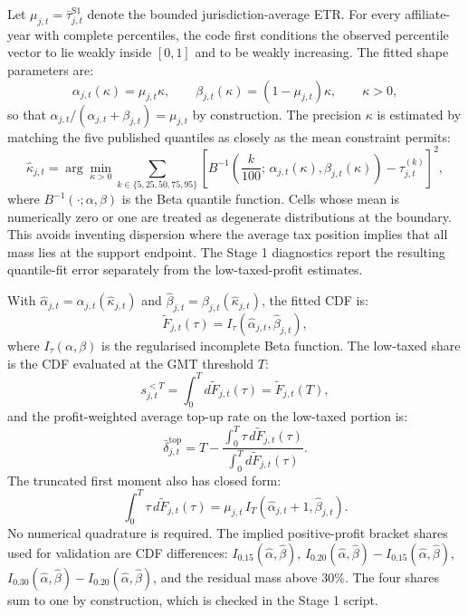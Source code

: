 \documentclass[11pt,a4paper]{article}
\begin{document}
Let $\mu_{j,t} = \bar{\tau}_{j,t}^{\text{S1}}$ denote the bounded jurisdiction-average ETR. For every affiliate-year with complete percentiles, the code first conditions the observed percentile vector to lie weakly inside $[0,1]$ and to be weakly increasing. The fitted shape parameters are:
\begin{equation}\label{eq:beta_shape}
\alpha_{j,t}(\kappa) = \mu_{j,t}\kappa, \qquad
\beta_{j,t}(\kappa) = (1-\mu_{j,t})\kappa, \qquad \kappa>0,
\end{equation}
so that $\alpha_{j,t}/(\alpha_{j,t}+\beta_{j,t}) = \mu_{j,t}$ by construction. The precision $\kappa$ is estimated by matching the five published quantiles as closely as the mean constraint permits:
\begin{equation}\label{eq:beta_fit}
\hat{\kappa}_{j,t}
= \arg\min_{\kappa>0}
\sum_{k \in \{5,25,50,75,95\}}
\left[
B^{-1}\!\left(\frac{k}{100};\,\alpha_{j,t}(\kappa),\beta_{j,t}(\kappa)\right)
- \tau_{j,t}^{(k)}
\right]^2 ,
\end{equation}
where $B^{-1}(\cdot;\alpha,\beta)$ is the Beta quantile function. Cells whose mean is numerically zero or one are treated as degenerate distributions at the boundary. This avoids inventing dispersion where the average tax position implies that all mass lies at the support endpoint. The Stage 1 diagnostics report the resulting quantile-fit error separately from the low-taxed-profit estimates.

With $\hat{\alpha}_{j,t}=\alpha_{j,t}(\hat{\kappa}_{j,t})$ and $\hat{\beta}_{j,t}=\beta_{j,t}(\hat{\kappa}_{j,t})$, the fitted CDF is:
\begin{equation}\label{eq:beta_cdf}
\tilde{F}_{j,t}(\tau) = I_{\tau}\!\left(\hat{\alpha}_{j,t},\hat{\beta}_{j,t}\right),
\end{equation}
where $I_{\tau}(\alpha,\beta)$ is the regularised incomplete Beta function. The low-taxed share is the CDF evaluated at the GMT threshold $T$:
\begin{equation}\label{eq:lowtax_share}
s_{j,t}^{<T} = \int_0^{T} d\tilde{F}_{j,t}(\tau) = \tilde{F}_{j,t}(T),
\end{equation}
and the profit-weighted average top-up rate on the low-taxed portion is:
\begin{equation}\label{eq:avg_topup_rate}
\bar{\delta}_{j,t}^{\text{top}} = T - \frac{\int_0^{T} \tau \, d\tilde{F}_{j,t}(\tau)}{\int_0^{T} d\tilde{F}_{j,t}(\tau)}.
\end{equation}
The truncated first moment also has closed form:
\begin{equation}\label{eq:beta_truncated_moment}
\int_0^{T} \tau \, d\tilde{F}_{j,t}(\tau)
= \mu_{j,t}\,I_T\!\left(\hat{\alpha}_{j,t}+1,\hat{\beta}_{j,t}\right).
\end{equation}
No numerical quadrature is required. The implied positive-profit bracket shares used for validation are CDF differences: $I_{0.15}(\hat{\alpha},\hat{\beta})$, $I_{0.20}(\hat{\alpha},\hat{\beta})-I_{0.15}(\hat{\alpha},\hat{\beta})$, $I_{0.30}(\hat{\alpha},\hat{\beta})-I_{0.20}(\hat{\alpha},\hat{\beta})$, and the residual mass above 30\%. The four shares sum to one by construction, which is checked in the Stage 1 script.
\end{document}
